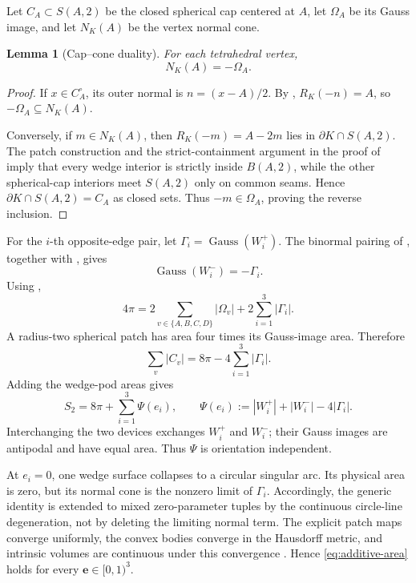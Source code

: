 \documentclass[11pt]{article}
\numberwithin{equation}{section}
\newtheorem{lemma}[theorem]{Lemma}
\theoremstyle{remark}
\newcommand{\Gauss}{\operatorname{Gauss}}
\begin{document}
Let \(C_A\subset S(A,2)\) be the closed spherical cap centered at \(A\), let \(\Omega_A\) be its Gauss image, and let \(N_K(A)\) be the vertex normal cone.

\begin{lemma}[Cap--cone duality]
\label{lem:cap-cone}
For each tetrahedral vertex,
\begin{equation}
  N_K(A)=-\Omega_A.
  \label{eq:cap-cone}
\end{equation}
\end{lemma}

\begin{proof}
If \(x\in C_A^\circ\), its outer normal is \(n=(x-A)/2\).  By , \(R_K(-n)=A\), so \(-\Omega_A\subseteq N_K(A)\).

Conversely, if \(m\in N_K(A)\), then \(R_K(-m)=A-2m\) lies in \(\partial K\cap S(A,2)\).  The patch construction and the strict-containment argument in the proof of \cite[Lemma~4.3]{ArelioMontejanoOliveros2023} imply that every wedge interior is strictly inside \(B(A,2)\), while the other spherical-cap interiors meet \(S(A,2)\) only on common seams.  Hence \(\partial K\cap S(A,2)=C_A\) as closed sets.  Thus \(-m\in\Omega_A\), proving the reverse inclusion.
\end{proof}

For the \(i\)-th opposite-edge pair, let \(\Gamma_i=\Gauss(W_i^+)\).  The binormal pairing of \cite[Lemma~3.8]{ArelioMontejanoOliveros2023}, together with , gives
\[
  \Gauss(W_i^-)=-\Gamma_i.
\]
Using ,
\begin{equation}
  4\pi
  =2\sum_{v\in\{A,B,C,D\}}|\Omega_v|
   +2\sum_{i=1}^3|\Gamma_i|.
  \label{eq:normal-partition}
\end{equation}
A radius-two spherical patch has area four times its Gauss-image area.  Therefore
\begin{equation}
  \sum_v|C_v|=8\pi-4\sum_{i=1}^3|\Gamma_i|.
  \label{eq:cap-elimination}
\end{equation}
Adding the wedge-pod areas gives
\begin{equation}
  S_2=8\pi+\sum_{i=1}^3\Psi(e_i),
  \qquad
  \Psi(e_i):=|W_i^+|+|W_i^-|-4|\Gamma_i|.
  \label{eq:additive-area}
\end{equation}
Interchanging the two devices exchanges \(W_i^+\) and \(W_i^-\); their Gauss images are antipodal and have equal area.  Thus \(\Psi\) is orientation independent.

At \(e_i=0\), one wedge surface collapses to a circular singular arc.  Its physical area is zero, but its normal cone is the nonzero limit of \(\Gamma_i\).  Accordingly, the generic identity is extended to mixed zero-parameter tuples by the continuous circle-line degeneration, not by deleting the limiting normal term.  The explicit patch maps converge uniformly, the convex bodies converge in the Hausdorff metric, and intrinsic volumes are continuous under this convergence \cite{Schneider2014}.  Hence \eqref{eq:additive-area} holds for every \(\mathbf e\in[0,1)^3\).
\end{document}

